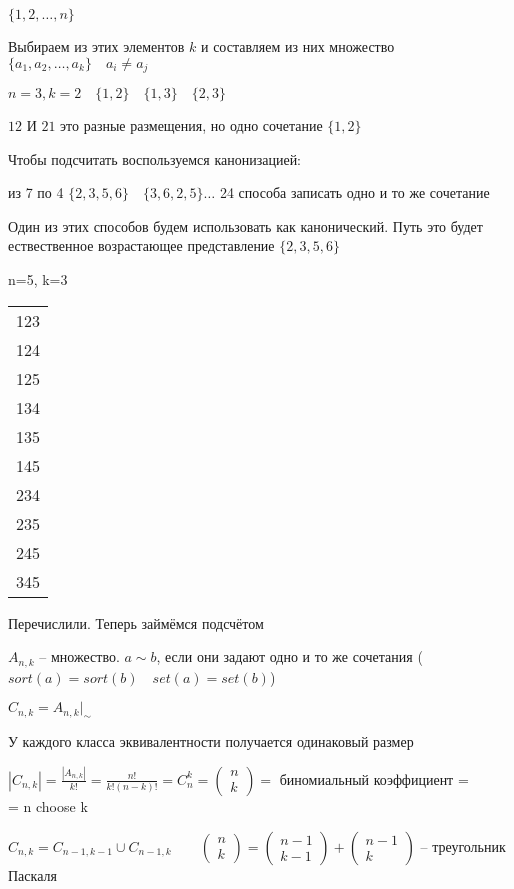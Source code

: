 \documentclass{book}
\theoremstyle{definition}
\begin{document}
$\{1, 2, \ldots, n\}$

Выбираем из этих элементов $k$ и составляем из них множество  $\{a_1, a_2, \ldots, a_k\}\quad a_i\neq a_j$

$n=3, k=2\quad \{1, 2\}\quad\{1,3\}\quad\{2,3\}$

$12$ И  $21$ это разные размещения, но одно сочетание  $\{1,2\}$

Чтобы подсчитать воспользуемся канонизацией:

из 7 по 4  $\{2,3,5,6\}\quad \{3,6,2,5\} \ldots$ 24 способа записать одно и то же сочетание

Один из этих способов будем использовать как канонический. Путь это будет ествественное возрастающее представление $\{2,3,5,6\}$

n=5, k=3
\begin{tabular}{c}
    123\\124\\125\\134\\135\\145\\234\\235\\245\\345\\
\end{tabular}

Перечислили. Теперь займёмся подсчётом

$A_{n, k}$ -- множество.  $a\sim b$, если они задают одно и то же сочетания ($sort(a) = sort(b)\quad set(a) = set(b) $)

$C_{n, k} = A_{n, k}|_{\sim }$ 

У каждого класса эквивалентности получается одинаковый размер 

$\left| C_{n, k} \right|  = \frac{\left| A_{n, k} \right| }{k!} = \frac{n!}{k!(n-k)!} = C_n^k = \begin{pmatrix} n\\k \end{pmatrix} =$ биномиальный коэффициент =\\= n choose k


$C_{n, k} = C_{n-1, k-1} \cup  C_{n-1, k}\qquad \begin{pmatrix} n\\k \end{pmatrix}  = \begin{pmatrix}n-1\\k-1  \end{pmatrix}  + \begin{pmatrix} n-1\\k \end{pmatrix} $ -- треугольник Паскаля
\end{document}
